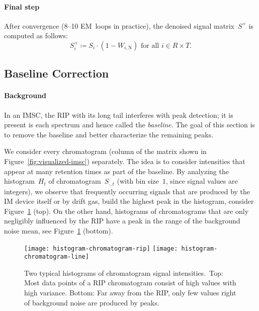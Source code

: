\documentclass{article}
\begin{document}
\paragraph*{Final step}
After convergence (8--10 EM~loops in practice), the denoised signal matrix~$S^+$ is computed as follows:
\[ S^+_{i} \coloneq S_{i} \cdot (1 - W_{i,\text{N}}) \text{ for all } i\in R\times T.
\]
\subsection{Baseline Correction}
\label{sec:baseline}

\paragraph*{Background}
In an IMSC, the RIP with its long tail interferes with peak detection; it is present is each spectrum and hence called the \emph{baseline}.
The goal of this section is to remove the baseline and better characterize the remaining peaks.

We consider every chromatogram (column of the matrix shown in Figure~\ref{fig:visualized-imsc}) separately.
The idea is to consider intensities that appear at many retention times as part of the baseline.
By analyzing the histogram~$H_t$ of chromatogram~$S_{\cdot, t}$ (with bin size~$1$, since signal values are integers), we observe that frequently occurring signals that are produced by the IM device itself or by drift gas, build the highest peak in the histogram, consider Figure~\ref{fig:histogram-chromatograms} (top).
On the other hand, histograms of chromatograms that are only negligibly influenced by the RIP have a peak in the range of the background noise mean, see Figure~\ref{fig:histogram-chromatograms} (bottom).
\begin{figure}[t]\centering
\texttt{[image: histogram-chromatogram-rip]}
\texttt{[image: histogram-chromatogram-line]}
\caption{Two typical histograms of chromatogram signal intensities.\
Top: Most data points of a RIP chromatogram consist of high values with high variance.
Bottom: Far away from the RIP, only few values right of background noise are produced by peaks.
}
\label{fig:histogram-chromatograms}
\end{figure}
\end{document}
